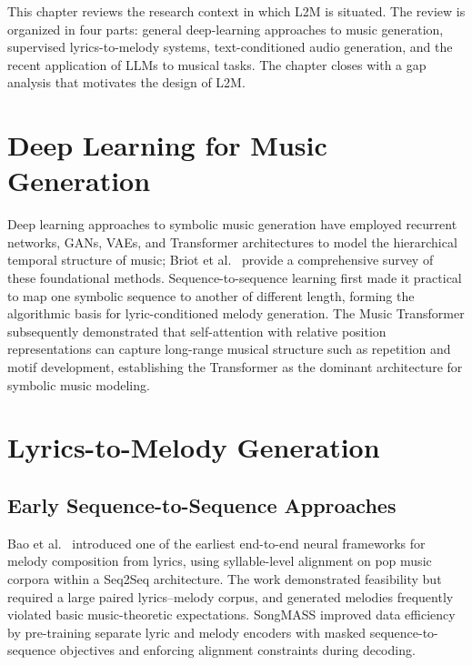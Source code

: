 This chapter reviews the research context in which L2M is situated. The
review is organized in four parts: general deep-learning approaches to music
generation, supervised lyrics-to-melody systems, text-conditioned audio
generation, and the recent application of LLMs to musical tasks. The chapter
closes with a gap analysis that motivates the design of L2M.

\section{Deep Learning for Music Generation}
\label{sec:lr-dl-music}

Deep learning approaches to symbolic music generation have employed
recurrent networks, GANs, VAEs, and Transformer architectures to model the
hierarchical temporal structure of music; Briot et
al.~\cite{briot20deeplearning} provide a comprehensive survey of these
foundational methods. Sequence-to-sequence learning
\cite{sutskever14seq2seq} first made it practical to map one symbolic
sequence to another of different length, forming the algorithmic basis for
lyric-conditioned melody generation. The Music Transformer
\cite{huang18musictransformer} subsequently demonstrated that self-attention
with relative position representations can capture long-range musical
structure such as repetition and motif development, establishing the
Transformer \cite{vaswani17attention} as the dominant architecture for
symbolic music modeling.

\section{Lyrics-to-Melody Generation}
\label{sec:lr-l2m}

\subsection{Early Sequence-to-Sequence Approaches}

Bao et al.~\cite{bao19neural} introduced one of the earliest end-to-end
neural frameworks for melody composition from lyrics, using syllable-level
alignment on pop music corpora within a Seq2Seq architecture. The work
demonstrated feasibility but required a large paired lyrics--melody corpus,
and generated melodies frequently violated basic music-theoretic
expectations. SongMASS \cite{sheng21songmass} improved data efficiency by
pre-training separate lyric and melody encoders with masked sequence-to-sequence
objectives and enforcing alignment constraints during decoding.

